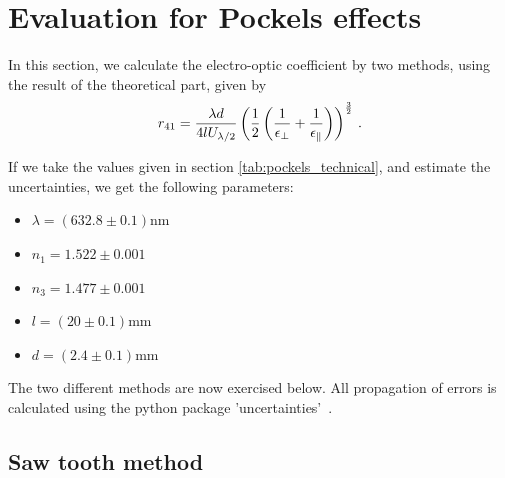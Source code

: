 \section{Evaluation for Pockels effects}
In this section, we calculate the electro-optic coefficient 
by two methods, using the result of the theoretical part, given by
\begin{equation}
    r_{41} = \frac{\lambda d}{4 l U_{\lambda / 2}} 
    \left(\frac{1}{2} \left(\frac{1}{\epsilon_\perp} + \frac{1}{\epsilon_\parallel}\right)\right)^{\frac{3}{2}}\, .
    \label{eq:r_41_U}
\end{equation}

If we take the values given in section \ref{tab:pockels_technical}, 
and estimate the uncertainties, we get the following parameters:
\begin{itemize}
\setlength\itemsep{0em}
\item[] $\lambda = (632.8\pm 0.1)$nm
\item[] $n_1     = 1.522\pm 0.001$
\item[] $n_3     = 1.477\pm 0.001$
\item[] $l       = ( 20\pm 0.1)$mm
\item[] $d       = (2.4\pm 0.1)$mm
\end{itemize}

The two different methods are now exercised below.
All propagation of errors is calculated using the python package 
'uncertainties'~\cite{uc}.


\subsection{Saw tooth method}
\label{ssub:Saw tooth method}


